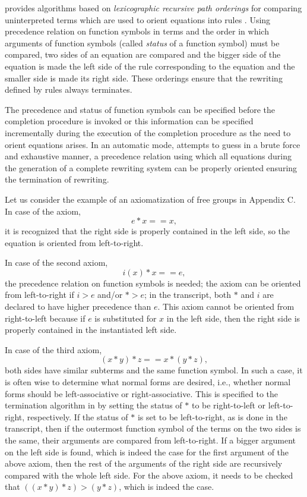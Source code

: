 \RRL provides algorithms based on {\em lexicographic recursive path
orderings} for comparing uninterpreted terms which are used to orient
equations into rules \cite{Dershowitz87}.  Using precedence relation on function symbols
in terms and the order in which arguments of function symbols (called
{\em status} of a function symbol) must be compared, two sides of an
equation are compared and the bigger side of the equation is made the
left side of the rule corresponding to the equation and the
smaller side is made its right side.  These orderings ensure that
the rewriting defined by rules always terminates.

The precedence and status of function symbols can be specified
before the completion procedure is invoked or this information
can be specified incrementally during the execution of the
completion procedure as the need to orient equations arises. In
an automatic mode, \RRL attempts to guess in a brute force and
exhaustive manner, a precedence relation using which all
equations during the generation of a complete rewriting system
can be properly oriented ensuring the termination of rewriting.
  
Let us consider the example of an axiomatization of free groups
in Appendix C. In case of the axiom,
    \[ e * x == x, \]
it is recognized that the right side is properly contained in the 
left side, so the equation is oriented from left-to-right.
  
In case of the second axiom,
    \[ i(x) * x == e ,\]
the precedence relation on function symbols is needed;
the axiom can be oriented from left-to-right if $i>e$ and/or
$* > e$; in the transcript, both $*$ and $i$ are declared
to have higher precedence than $e$. 
This axiom cannot be oriented from right-to-left
because if $e$ is substituted for $x$ in the left side, then the 
right side is properly contained in the instantiated left side.
  
In case of the third axiom,
     \[(x * y) * z == x * (y * z),\]
both sides have similar subterms and the same function symbol. In such
a case, it is often wise to determine what normal forms are desired,
i.e., whether normal forms should be left-associative or right-associative.
This is specified to the termination algorithm in \RRL
by setting the status of $*$ to be right-to-left or left-to-right,
respectively. If the status of $*$ is set to be left-to-right,
as is done in the transcript,
then if the outermost function symbol of the terms on the two
sides is the same, their arguments are compared from left-to-right.
If a bigger argument on the left side is found,
which is indeed the case for the first argument of the above axiom, then
the rest of the arguments of the right side are
recursively compared with
the whole left side. For the above axiom, it needs to be checked
that $((x * y)* z) > (y * z)$, which is indeed the case.
  
